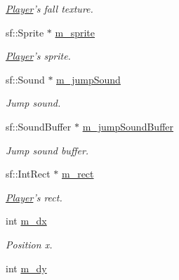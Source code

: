 \begin{DoxyCompactItemize}
\begin{DoxyCompactList}\small\item\em \hyperlink{class_player}{Player}'s fall texture. \end{DoxyCompactList}\item 
\hypertarget{class_player_a06b952ac7dc29ec9ca7374c41ececb36}{sf\-::\-Sprite $\ast$ \hyperlink{class_player_a06b952ac7dc29ec9ca7374c41ececb36}{m\-\_\-sprite}}\label{class_player_a06b952ac7dc29ec9ca7374c41ececb36}

\begin{DoxyCompactList}\small\item\em \hyperlink{class_player}{Player}'s sprite. \end{DoxyCompactList}\item 
\hypertarget{class_player_a1586ec20fe0ab3172bbe4b7fed22b028}{sf\-::\-Sound $\ast$ \hyperlink{class_player_a1586ec20fe0ab3172bbe4b7fed22b028}{m\-\_\-jump\-Sound}}\label{class_player_a1586ec20fe0ab3172bbe4b7fed22b028}

\begin{DoxyCompactList}\small\item\em Jump sound. \end{DoxyCompactList}\item 
\hypertarget{class_player_ada9922e4960f83ff5e7135aeccd07848}{sf\-::\-Sound\-Buffer $\ast$ \hyperlink{class_player_ada9922e4960f83ff5e7135aeccd07848}{m\-\_\-jump\-Sound\-Buffer}}\label{class_player_ada9922e4960f83ff5e7135aeccd07848}

\begin{DoxyCompactList}\small\item\em Jump sound buffer. \end{DoxyCompactList}\item 
\hypertarget{class_player_a0ed905d7ce35dc1bb142861d97955e2e}{sf\-::\-Int\-Rect $\ast$ \hyperlink{class_player_a0ed905d7ce35dc1bb142861d97955e2e}{m\-\_\-rect}}\label{class_player_a0ed905d7ce35dc1bb142861d97955e2e}

\begin{DoxyCompactList}\small\item\em \hyperlink{class_player}{Player}'s rect. \end{DoxyCompactList}\item 
\hypertarget{class_player_a038a574bcbe535460f024c28b5348191}{int \hyperlink{class_player_a038a574bcbe535460f024c28b5348191}{m\-\_\-dx}}\label{class_player_a038a574bcbe535460f024c28b5348191}

\begin{DoxyCompactList}\small\item\em Position x. \end{DoxyCompactList}\item 
\hypertarget{class_player_a699a186e9a37c898f938c21e6a086821}{int \hyperlink{class_player_a699a186e9a37c898f938c21e6a086821}{m\-\_\-dy}}\label{class_player_a699a186e9a37c898f938c21e6a086821}


\end{DoxyCompactItemize}
